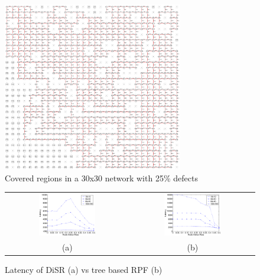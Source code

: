 \begin{figure}
\centering
\includegraphics[width=0.70\textwidth]{pictures/net.ps}
\caption{Covered regions in a 30x30 network with 25\% defects}
\label{fig:net}
\end{figure}

\begin{figure}
\centering
\begin{tabular}{cc}
\includegraphics[width=0.48\textwidth]{pictures/set2.eps} & 
\includegraphics[width=0.48\textwidth]{pictures/set2_rpf.eps} \\
(a) & (b)
\end{tabular}
\caption{Latency of DiSR (a) vs tree based RPF (b) }
\label{fig:results_latency}
\end{figure}

